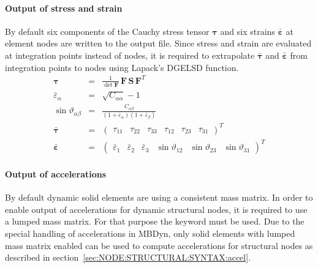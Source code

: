 \paragraph{Output of stress and strain}
By default six components of the Cauchy stress tensor $\boldsymbol{\tau}$ and six strains $\bar{\boldsymbol{\varepsilon}}$ at element nodes are written to the output file.
Since stress and strain are evaluated at integration points instead of nodes, it is required to extrapolate $\bar{\boldsymbol{\tau}}$ and $\bar{\boldsymbol{\varepsilon}}$
from integration points to nodes using Lapack's DGELSD function.
\begin{eqnarray}
  \boldsymbol{\tau} & = & \frac{1}{\det{\boldsymbol{F}}} \, \boldsymbol{F} \, \boldsymbol{S} \, \boldsymbol{F}^T \\
  \bar{\varepsilon}_{\alpha} & = & \sqrt{C_{\alpha\alpha}} - 1 \\
  \sin{\vartheta_{\alpha\beta}} & = & \frac{C_{\alpha\beta}}{\left(1 + \bar{\varepsilon}_{\alpha}\right)\left(1 + \bar{\varepsilon}_{\beta}\right)} \\
  \bar{\boldsymbol{\tau}} & = & \begin{pmatrix}
    \tau_{11} &
    \tau_{22} &
    \tau_{33} &
    \tau_{12} &
    \tau_{23} &
    \tau_{31}
  \end{pmatrix}^T \\
  \bar{\boldsymbol{\varepsilon}} & = & \begin{pmatrix}
    \bar{\varepsilon}_1 &
    \bar{\varepsilon}_2 &
    \bar{\varepsilon}_3 &
    \sin{\vartheta}_{12} &
    \sin{\vartheta}_{23} &
    \sin{\vartheta}_{31}
  \end{pmatrix}^T
\end{eqnarray}

\paragraph{Output of accelerations}
By default dynamic solid elements are using a consistent mass matrix. In order to enable output of accelerations
for dynamic structural nodes, it is required to use a lumped mass matrix.
For that purpose the keyword  must be used.
Due to the special handling of accelerations in MBDyn, only solid elements with lumped mass matrix enabled
can be used to compute accelerations for structural nodes as described in section~\ref{sec:NODE:STRUCTURAL:SYNTAX:accel}.

